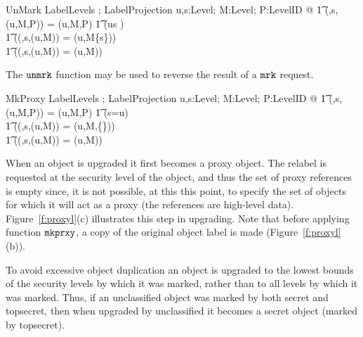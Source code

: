 \begin{schema}{UnMark}
LabelLevels ; LabelProjection
\where
\forall u,s:Level; M:\power Level; P:Level\pfun ID @ 
\also
\t1 \Rfun(\unmark,s,\Proxy(u,M,P)) = \Proxy(u,M,P) \land 
\also
\t1 \IF (u\fleq s )\\
\t1 \THEN (\Rfun(\unmark,s,\Object(u,M)) = \Object(u,M\setminus\{s\}))\\
\t1 \ELSE (\Rfun(\unmark,s,\Object(u,M)) = \Object(u,M)) 
\end{schema}
The $\mbox{\tt unmrk}$ function may be used to reverse the result of a 
$\mbox{\tt mrk}$ request. 

\begin{schema}{MkProxy}
LabelLevels ; LabelProjection
\where
\forall u,s:Level; M:\power Level; P:Level\pfun ID @ 
\also
\t1 \Rfun(\upgrade,s,\Proxy(u,M,P)) = \Proxy(u,M,P) \land 
\also
\t1 \IF (s=u) \\
\t1 \THEN  (\Rfun(\upgrade,s,\Object(u,M)) = \Proxy(u,M,\{\})) \\
\t1 \ELSE  (\Rfun(\upgrade,s,\Object(u,M)) = \Object(u,M))
\end{schema}
When an object is upgraded it first becomes a proxy object.  The
relabel is requested at the security level of the object, and thus the set of
proxy references is empty since, it is not possible, at this this
point, to specify the  set of objects for which it will act as a proxy
(the references are high-level data).  Figure~\ref{f:proxyl}(c)
illustrates this step in upgrading. Note that before applying function
$\mbox{\tt mkprxy}$, a copy of the original object label is made (Figure~\ref{f:proxyl}(b)).

To avoid excessive object duplication an object is upgraded  to
the lowest bounds of the security levels by which it was marked, 
rather than to all
levels by which it was marked.  Thus, if an unclassified object was marked by
both secret  and topsecret, then when upgraded by unclassified it
becomes a secret object (marked by topsecret).  

